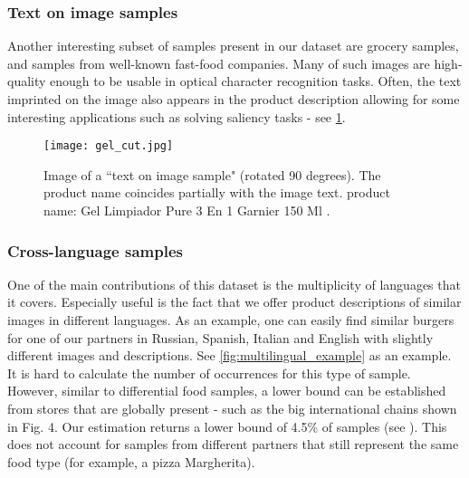 \documentclass[10pt,twocolumn,letterpaper]{article}
\begin{document}
\subsubsection{Text on image samples}
Another interesting subset of samples present in our dataset are grocery samples, and samples from well-known fast-food companies. Many of such images are high-quality enough to be usable in optical character recognition tasks. Often, the text imprinted on the image also appears in the product description allowing for some interesting applications such as solving saliency tasks - see  \cref{fig:example_cleaning}. 

\begin{figure}[ht]
  \centering
    \texttt{[image: gel\_cut.jpg]}
  \caption{Image of a ``text on image sample" (rotated 90 degrees). The product name coincides partially with the image text. product name: Gel Limpiador Pure 3 En 1 Garnier 150 Ml  \label{fig:example_cleaning}.}
\end{figure}
\subsubsection{Cross-language samples}
One of the main contributions of this dataset is the multiplicity of languages that it covers. Especially useful is the fact that we offer product descriptions of similar images in different languages. As an example, one can easily find similar burgers for one of our partners in Russian, Spanish, Italian and English with slightly different images and descriptions. See \cref{fig:multilingual_example} as an example. It is hard to calculate the number of occurrences for this type of sample. However, similar to differential food samples, a lower bound can be established from stores that are globally present - such as the big international chains shown in Fig. 4. Our estimation returns a lower bound of 4.5\% of samples (see \cite{app_2021}). This does not account for samples from different partners that still represent the same food type (for example, a pizza Margherita).
\end{document}
